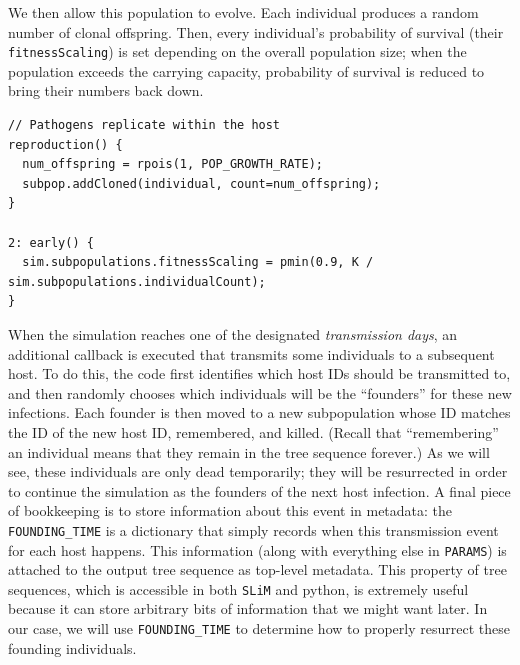 \documentclass[12pt]{article}
\newcommand{\slim}[0]{\texttt{SLiM}\xspace}
\begin{document}
We then allow this population to evolve.
Each individual produces a random number of clonal offspring.
Then, every individual's probability of survival
(their \verb|fitnessScaling|) is set depending on the overall population size;
when the population exceeds the carrying capacity,
probability of survival is reduced to bring their numbers back down.
\begin{lstlisting}[language=slim, style=slimstyle, breaklines=true]
// Pathogens replicate within the host
reproduction() {
  num_offspring = rpois(1, POP_GROWTH_RATE);
  subpop.addCloned(individual, count=num_offspring);
}

2: early() {
  sim.subpopulations.fitnessScaling = pmin(0.9, K / sim.subpopulations.individualCount);
}
\end{lstlisting}

When the simulation reaches one of the designated \textit{transmission days},
an additional callback is executed that transmits some individuals to a subsequent host.
To do this, the code first identifies which host IDs should be transmitted to,
and then randomly chooses which individuals will be the ``founders'' for these new infections.
Each founder is then moved to a new subpopulation whose ID matches the ID of the new host ID,
remembered, and killed.
(Recall that ``remembering'' an individual means that they remain in the tree sequence forever.)
As we will see, these individuals are only dead temporarily;
they will be resurrected in order to
continue the simulation as the founders of the next host infection.
 A final piece of bookkeeping is to store information about this event in metadata:
the \verb|FOUNDING_TIME| is a dictionary that simply records when this transmission event for each host happens.
This information (along with everything else in \verb|PARAMS|)
is attached to the output tree sequence as top-level metadata.
This property
of tree sequences, which is accessible in both \slim and python, is extremely useful because it can store arbitrary bits of information that we might want later.
In our case,
we will use \verb|FOUNDING_TIME| to determine how to properly resurrect these founding individuals.
\end{document}
